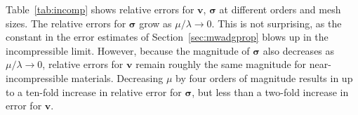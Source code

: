 \documentclass{siamart0216}
\begin{document}
Table~\ref{tab:incomp} shows relative errors for $\bm{v}$, $\bm{\sigma}$ at different orders and mesh sizes.  The relative errors for $\bm{\sigma}$ grow as $\mu/\lambda \rightarrow 0$.  This is not surprising, as the constant in the error estimates of Section~\ref{sec:mwadgprop} blows up in the incompressible limit.  However, because the magnitude of $\bm{\sigma}$ also decreases as $\mu/\lambda\rightarrow 0$, relative errors for $\bm{v}$ remain roughly the same magnitude for near-incompressible materials.  Decreasing $\mu$ by four orders of magnitude results in up to a ten-fold increase in relative error for $\bm{\sigma}$, but less than a two-fold increase in error for $\bm{v}$.  
\end{document}
